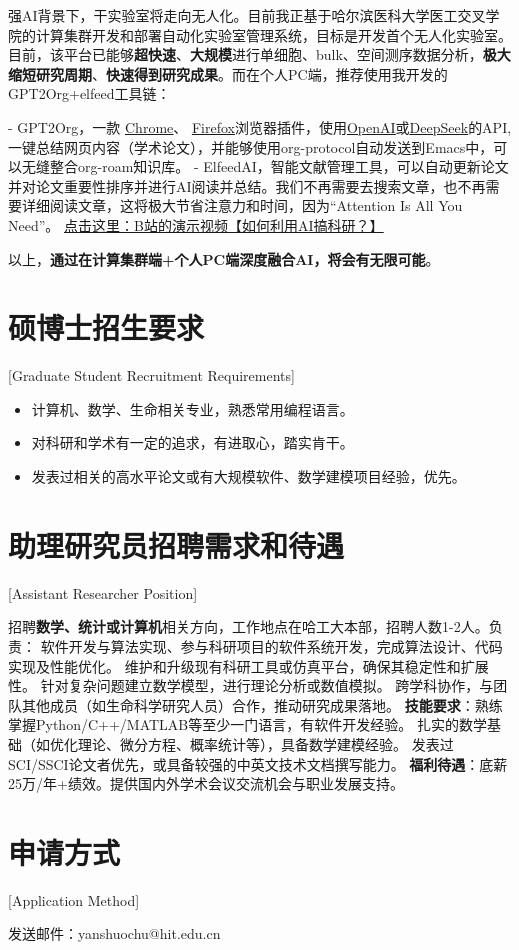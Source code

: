 强AI背景下，干实验室将走向无人化。目前我正基于哈尔滨医科大学医工交叉学院的计算集群开发和部署自动化实验室管理系统，目标是开发首个无人化实验室。目前，该平台已能够\textbf{超快速}、\textbf{大规模}进行单细胞、bulk、空间测序数据分析，\textbf{极大缩短研究周期}、\textbf{快速得到研究成果}。而在个人PC端，推荐使用我开发的GPT2Org+elfeed工具链：

- GPT2Org，一款
\href{https://chromewebstore.google.com/detail/gpt2org/nedljjoclmlgpobfohcnanjipnblgjbo?pli=1}{\uline{Chrome}}、
\href{https://addons.mozilla.org/en-US/firefox/addon/gpt2org/}{\uline{Firefox}}浏览器插件，使用\href{https://platform.openai.com/api-keys}{\uline{OpenAI}}或\href{https://platform.deepseek.com/api_keys}{\uline{DeepSeek}}的API,一键总结网页内容（学术论文），并能够使用org-protocol自动发送到Emacs中，可以无缝整合org-roam知识库。
- ElfeedAI，智能文献管理工具，可以自动更新论文并对论文重要性排序并进行AI阅读并总结。我们不再需要去搜索文章，也不再需要详细阅读文章，这将极大节省注意力和时间，因为“Attention Is All You Need”。
\href{https://www.bilibili.com/video/BV1dModYPE3c/?share_source=copy_web&vd_source=d6f2f3603fdf3b24c20399fbfd25df0d}{\uline{点击这里：B站的演示视频【如何利用AI搞科研？】}}

以上，\textbf{通过在计算集群端+个人PC端深度融合AI，将会有无限可能}。

\section{硕博士招生要求}[Graduate Student Recruitment Requirements]

\begin{itemize}
\item 计算机、数学、生命相关专业，熟悉常用编程语言。
\item 对科研和学术有一定的追求，有进取心，踏实肯干。
\item 发表过相关的高水平论文或有大规模软件、数学建模项目经验，优先。
\end{itemize}

\section{助理研究员招聘需求和待遇}[Assistant Researcher Position]

招聘\textbf{数学、统计或计算机}相关方向，工作地点在哈工大本部，招聘人数1-2人。负责：
软件开发与算法实现、参与科研项目的软件系统开发，完成算法设计、代码实现及性能优化。
维护和升级现有科研工具或仿真平台，确保其稳定性和扩展性。
针对复杂问题建立数学模型，进行理论分析或数值模拟。
跨学科协作，与团队其他成员（如生命科学研究人员）合作，推动研究成果落地。
\textbf{技能要求}：熟练掌握Python/C++/MATLAB等至少一门语言，有软件开发经验。
扎实的数学基础（如优化理论、微分方程、概率统计等），具备数学建模经验。
发表过SCI/SSCI论文者优先，或具备较强的中英文技术文档撰写能力。
\textbf{福利待遇}：底薪25万/年+绩效。提供国内外学术会议交流机会与职业发展支持。

\section{申请方式}[Application Method]

发送邮件：yanshuochu@hit.edu.cn


